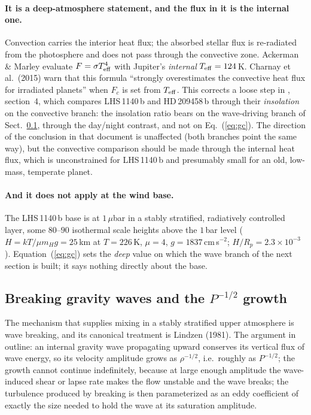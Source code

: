 \documentclass[english,a4paper]{my_memo}
\begin{document}
\paragraph{It is a deep-atmosphere statement, and the flux in it is the
internal one.} Convection carries the interior heat flux; the absorbed
stellar flux is re-radiated from the photosphere and does not pass through
the convective zone. Ackerman \& Marley evaluate $F = \sigma T_{\rm
eff}^{4}$ with Jupiter's \emph{internal} $T_{\rm eff} = 124$\,K. Charnay et
al.\ (2015) warn that this formula ``strongly overestimates the convective
heat flux for irradiated planets'' when $F_c$ is set from $T_{\rm eff}$.
This corrects a loose step in ,
section~4, which compares LHS\,1140\,b and HD\,209458\,b through their
\emph{insolation} on the convective branch: the insolation ratio bears on
the wave-driving branch of Sect.~\ref{sec:gw}, through the day/night
contrast, and not on Eq.~(\ref{eq:gc}). The direction of the conclusion in
that document is unaffected (both branches point the same way), but the
convective comparison should be made through the internal heat flux, which
is unconstrained for LHS\,1140\,b and presumably small for an old,
low-mass, temperate planet.

\paragraph{And it does not apply at the wind base.} The LHS\,1140\,b base is
at $1\,\mu$bar in a stably stratified, radiatively controlled layer, some
$80$--$90$ isothermal scale heights above the $1$\,bar level
($H = kT/\mu m_H g = 25$\,km at $T = 226$\,K, $\mu = 4$, $g =
1837$\,cm\,s$^{-2}$; $H/R_p = 2.3\times10^{-3}$). Equation~(\ref{eq:gc})
sets the \emph{deep} value on which the wave branch of the next section is
built; it says nothing directly about the base.

\subsection{Breaking gravity waves and the $P^{-1/2}$ growth}
\label{sec:gw}

The mechanism that supplies mixing in a stably stratified upper atmosphere
is wave breaking, and its canonical treatment is Lindzen (1981). The
argument in outline: an internal gravity wave propagating upward conserves
its vertical flux of wave energy, so its velocity amplitude grows as
$\rho^{-1/2}$, i.e.\ roughly as $P^{-1/2}$; the growth cannot continue
indefinitely, because at large enough amplitude the wave-induced shear or
lapse rate makes the flow unstable and the wave breaks; the turbulence
produced by breaking is then parameterized as an eddy coefficient of exactly
the size needed to hold the wave at its saturation amplitude.
\end{document}
